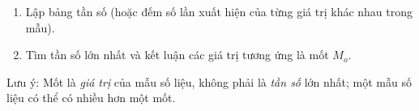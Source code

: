 \begin{enumerate}
\item Lập bảng tần số (hoặc đếm số lần xuất hiện của từng giá trị khác nhau trong mẫu).
\item Tìm tần số lớn nhất và kết luận các giá trị tương ứng là mốt $M_o$.
\end{enumerate}
Lưu ý: Mốt là \textit{giá trị} của mẫu số liệu, không phải là \textit{tần số} lớn nhất; một mẫu số liệu có thể có nhiều hơn một mốt.
